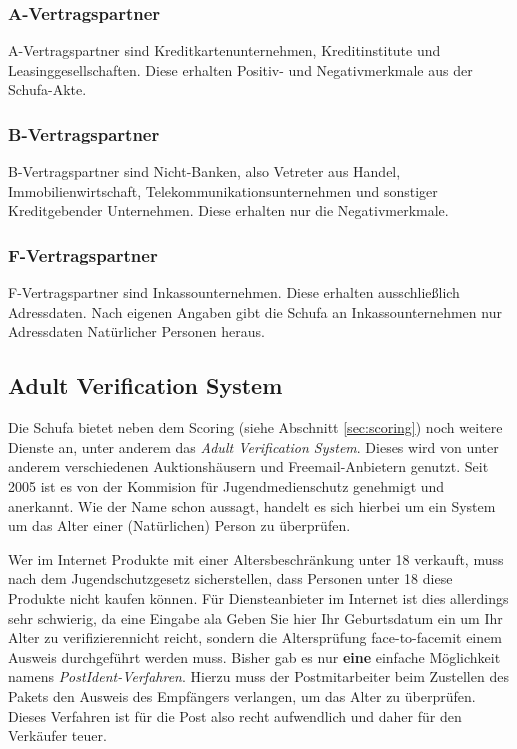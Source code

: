 \documentclass[12pt]{article}
\begin{document}
\subsubsection{A-Vertragspartner}
A-Vertragspartner sind Kreditkartenunternehmen, Kreditinstitute und Leasinggesellschaften. Diese erhalten Positiv- und Negativmerkmale aus der Schufa-Akte.

\subsubsection{B-Vertragspartner}
B-Vertragspartner sind Nicht-Banken, also Vetreter aus Handel, Immobilienwirtschaft, Telekommunikationsunternehmen und sonstiger Kreditgebender Unternehmen. Diese erhalten nur die Negativmerkmale.

\subsubsection{F-Vertragspartner}
F-Vertragspartner sind Inkassounternehmen. Diese erhalten ausschließlich Adressdaten. Nach eigenen Angaben gibt die Schufa an Inkassounternehmen nur Adressdaten Natürlicher Personen heraus.



\subsection{Adult Verification System}
Die Schufa bietet neben dem Scoring (siehe Abschnitt \ref{sec:scoring}) noch weitere Dienste an, unter anderem das \textit{Adult Verification System}.
Dieses wird von unter anderem verschiedenen Auktionshäusern und Freemail-Anbietern genutzt. Seit 2005 ist es von der Kommision für Jugendmedienschutz genehmigt und anerkannt.
Wie der Name schon aussagt, handelt es sich hierbei um ein System um das Alter einer (Natürlichen) Person zu überprüfen.

Wer im Internet Produkte mit einer Altersbeschränkung unter 18 verkauft, muss nach dem Jugendschutzgesetz sicherstellen, dass Personen unter 18 diese Produkte nicht kaufen können.
Für Diensteanbieter im Internet ist dies allerdings sehr schwierig, da eine Eingabe ala \glqq Geben Sie hier Ihr Geburtsdatum ein um Ihr Alter zu verifizieren\grqq nicht reicht, sondern
die Altersprüfung \glqq face-to-face\grqq mit einem Ausweis durchgeführt werden muss. Bisher gab es nur \textbf{eine} einfache Möglichkeit namens \textit{PostIdent-Verfahren}. Hierzu muss der Postmitarbeiter 
beim Zustellen des Pakets den Ausweis des Empfängers verlangen, um das Alter zu überprüfen. Dieses Verfahren ist für die Post also recht aufwendlich und daher für den Verkäufer teuer. 
\end{document}
